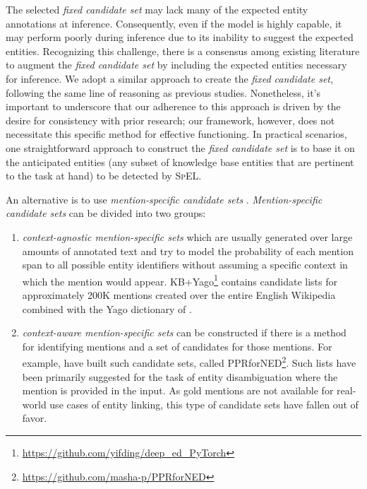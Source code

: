 \documentclass[11pt]{article}
\begin{document}
The selected \textit{fixed candidate set} may lack many of the expected entity annotations at inference. Consequently, even if the model is highly capable, it may perform poorly during inference due to its inability to suggest the expected entities. Recognizing this challenge, there is a consensus among existing literature \cite{K18-1050, K19-1063, D19-1005, 2020.findings-emnlp.71} to augment the \textit{fixed candidate set} by including the expected entities necessary for inference. We adopt a similar approach to create the \textit{fixed candidate set}, following the same line of reasoning as previous studies.
Nonetheless, it's important to underscore that our adherence to this approach is driven by the desire for consistency with prior research; our framework, however, does not necessitate this specific method for effective functioning. In practical scenarios, one straightforward approach to construct the \textit{fixed candidate set} is to base it on the anticipated entities (any subset of knowledge base entities that are pertinent to the task at hand) to be detected by \textsc{SpEL}.

An alternative is to use \textit{mention-specific candidate sets} \cite{K18-1050, D19-1005, CHOLAN, GENRE, 2021.emnlp-main.604}. \textit{Mention-specific candidate sets} can be divided into two groups:
\begin{enumerate}
    \vspace{-0.5em}
    \itemsep0em 
    \item[(1)] \textit{context-agnostic mention-specific sets} which are usually generated over large amounts of annotated text and try to model the probability of each mention span to all possible entity identifiers without assuming a specific context in which the mention would appear. KB+Yago\footnote{\href{https://github.com/yifding/deep_ed_PyTorch}{https://github.com/yifding/deep\_ed\_PyTorch}} \cite{D17-1277} contains candidate lists for approximately 200K mentions created over the entire English Wikipedia combined with the Yago dictionary of \cite{D11-1072}.
    \item[(2)] \textit{context-aware mention-specific sets} can be constructed if there is a method for identifying mentions and a set of candidates for those mentions. For example, \citet{N15-1026} have built such candidate sets, called PPRforNED\footnote{\href{https://github.com/masha-p/PPRforNED}{https://github.com/masha-p/PPRforNED}}. Such lists have been primarily suggested for the task of entity disambiguation where the mention is provided in the input. As gold mentions are not available for real-world use cases of entity linking, this type of candidate sets have fallen out of favor.
    \vspace{-0.2em}
\end{enumerate}
\end{document}

